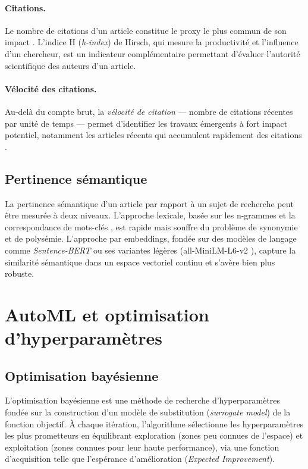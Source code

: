 \paragraph{Citations.}
Le nombre de citations d'un article constitue le proxy le plus commun de
son impact \cite{hirsch2005index}. L'indice H (\textit{h-index}) de Hirsch,
qui mesure la productivité et l'influence d'un chercheur, est un indicateur
complémentaire permettant d'évaluer l'autorité scientifique des auteurs
d'un article.

\paragraph{Vélocité des citations.}
Au-delà du compte brut, la \textit{vélocité de citation} — nombre de citations
récentes par unité de temps — permet d'identifier les travaux émergents à fort
impact potentiel, notamment les articles récents qui accumulent rapidement
des citations \cite{ke2015defining}.

\subsection{Pertinence sémantique}

La pertinence sémantique d'un article par rapport à un sujet de recherche
peut être mesurée à deux niveaux. L'approche lexicale, basée sur les
n-grammes et la correspondance de mots-clés \cite{jones1972statistical},
est rapide mais souffre du problème de synonymie et de polysémie.
L'approche par embeddings, fondée sur des modèles de langage comme
\textit{Sentence-BERT} \cite{reimers2019sentencebert} ou ses variantes
légères (all-MiniLM-L6-v2 \cite{wang2020minilm}), capture la similarité
sémantique dans un espace vectoriel continu et s'avère bien plus robuste.

\section{AutoML et optimisation d'hyperparamètres}

\subsection{Optimisation bayésienne}

L'optimisation bayésienne \cite{snoek2012practical} est une méthode de
recherche d'hyperparamètres fondée sur la construction d'un modèle de
substitution (\textit{surrogate model}) de la fonction objectif. À chaque
itération, l'algorithme sélectionne les hyperparamètres les plus prometteurs
en équilibrant exploration (zones peu connues de l'espace) et exploitation
(zones connues pour leur haute performance), via une fonction d'acquisition
telle que l'espérance d'amélioration (\textit{Expected Improvement}).

